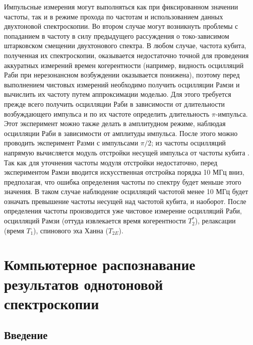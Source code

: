 \documentclass[14pt, a4paper]{extreport}
\numberwithin{equation}{section}
\begin{document}
Импульсные измерения могут выполняться как при фиксированном значении частоты, так и в режиме прохода по частотам и использованием данных двухтоновой спектроскопии. Во втором случае могут возникнуть проблемы с попаданием в частоту в силу предыдущего рассуждения о токо-зависимом штарковском смещении двухтонового спектра. В любом случае, частота кубита, полученная их спектроскопии, оказывается недостаточно точной для проведения аккуратных измерений времен когерентности (например, видность осцилляций Раби при нерезонансном возбуждении оказывается понижена), поэтому перед выполнением чистовых измерений необходимо получить осцилляции Рамзи и вычислить их частоту путем аппроксимации моделью. Для этого требуется прежде всего получить осцилляции Раби в зависимости от длительности возбуждающего импульса и по их частоте определить длительность $\pi$-импульса. Этот эксперимент можно также делать в амплитудном режиме, наблюдая осцилляции Раби в зависимости от амплитуды импульса. После этого можно проводить эксперимент Разми с импульсами $\pi/2$; из частоты осцилляций напрямую вычисляется модуль отстройки несущей импульса от частоты кубита \cite{fedorov2017}. Так как для уточнения частоты модуля отстройки недостаточно, перед экспериментом Рамзи вводится искусственная отстройка порядка 10 МГц вниз, предполагая, что ошибка определения частоты по спектру будет меньше этого значения. В таком случае наблюдение осцилляций частотой менее 10 МГц будет означать превышение частоты несущей над частотой кубита, и наоборот. После определения частоты производится уже чистовое измерение осцилляций Раби, осцилляций Рамзи (оттуда извлекается время когерентности $T_2^*$), релаксации (время $T_1$), спинового эха Ханна ($T_{2E}$).

\section{Компьютерное распознавание результатов однотоновой спектроскопии}

\subsection{Введение}
\end{document}

